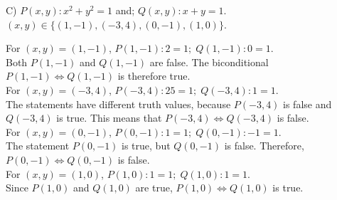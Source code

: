 \documentclass[12pt]{article}
\newenvironment{problem}[2][Problem]{\begin{trivlist}
		\item[\hskip \labelsep {\bfseries #1}\hskip \labelsep {\bfseries #2.}]}{\end{trivlist}}
\newenvironment{solution}[2][Solution]{\begin{trivlist}
		\item[\hskip \labelsep {\bfseries #1}\hskip \labelsep {\bfseries #2.}]}{\end{trivlist}}
\begin{document}
\begin{problem}{40}
(C) $P(x,y): x^{2} + y^{2} = 1$ and; $Q(x,y) : x + y =1.$\\
\indent $(x,y) \in \{(1,-1),(-3,4),(0,-1),(1,0)\}$.
\begin{solution}{c}
	For $(x,y) = (1,-1)$, $P(1,-1):2=1; \; Q(1,-1):0=1.$\\
	Both $P(1,-1)$ and $Q(1,-1)$ are false. The biconditional $P(1,-1) \Leftrightarrow Q(1,-1)$ is therefore true.\\ 
	
	\noindent For $(x,y) = (-3, 4)$, $P(-3,4): 25 = 1; \; Q(-3,4): 1 = 1.$\\
	The statements have different truth values, because $P(-3,4)$ is false and $Q(-3,4)$ is true. This means that $P(-3,4) \Leftrightarrow Q(-3,4)$ is false.\\
	
	\noindent For $(x,y) = (0,-1)$, $P(0,-1):1=1; \; Q(0,-1): -1 = 1.$\\
	The statement $P(0,-1)$ is true, but $Q(0,-1)$ is false. Therefore, $P(0,-1) \Leftrightarrow Q(0,-1)$ is false.\\
	
	\noindent For $(x,y) = (1,0)$, $P(1,0):1=1; \; Q(1,0):1=1.$\\
	Since $P(1,0)$ and $Q(1,0)$ are true, $P(1,0) \Leftrightarrow Q(1,0)$ is true.\\
\end{solution}

\end{problem}
\end{document}
